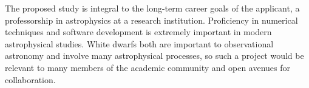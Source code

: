 \documentclass[12pt,
        usenames, %
        dvipsnames %
    ]{article}
\begin{document}
The proposed study is integral to the long-term career goals of the applicant,
a professorship in astrophysics at a research institution. Proficiency in
numerical techniques and software development is extremely important in modern
astrophysical studies. White dwarfs both are important to observational
astronomy and involve many astrophysical processes, so such a project would be
relevant to many members of the academic community and open avenues for
collaboration.





\end{document}
